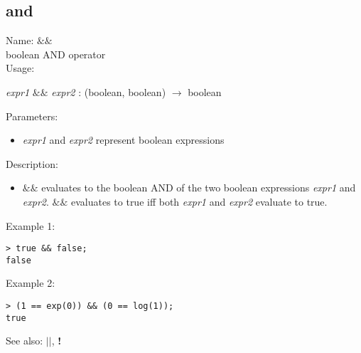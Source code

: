 \subsection{ and }
\noindent Name: \textbf{$\&\&$}\\
boolean AND operator\\

\noindent Usage: 
\begin{center}
\emph{expr1} \textbf{$\&\&$} \emph{expr2} : (\textsf{boolean}, \textsf{boolean}) $\rightarrow$ \textsf{boolean}\\
\end{center}
Parameters: 
\begin{itemize}
\item \emph{expr1} and \emph{expr2} represent boolean expressions
\end{itemize}
\noindent Description: \begin{itemize}

\item \textbf{$\&\&$} evaluates to the boolean AND of the two
   boolean expressions \emph{expr1} and \emph{expr2}. \textbf{$\&\&$} evaluates to 
   true iff both \emph{expr1} and \emph{expr2} evaluate to true.
\end{itemize}
\noindent Example 1: 
\begin{center}\begin{minipage}{15cm}\begin{Verbatim}[frame=single]
> true && false;
false
\end{Verbatim}
\end{minipage}\end{center}
\noindent Example 2: 
\begin{center}\begin{minipage}{15cm}\begin{Verbatim}[frame=single]
> (1 == exp(0)) && (0 == log(1));
true
\end{Verbatim}
\end{minipage}\end{center}
See also: \textbf{$||$}, \textbf{!}
